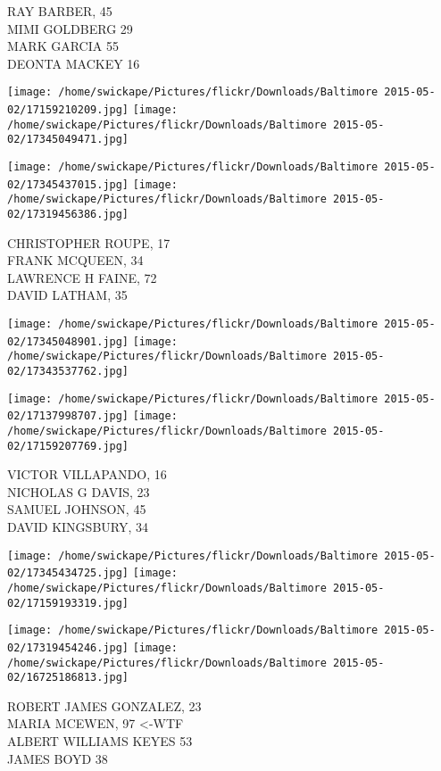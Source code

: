\documentclass[10pt,letterpaper]{article}
\begin{document}
RAY BARBER, 45\\
MIMI GOLDBERG 29\\
MARK GARCIA 55\\
DEONTA MACKEY 16
\pagebreak

\texttt{[image: /home/swickape/Pictures/flickr/Downloads/Baltimore 2015-05-02/17159210209.jpg]}
\texttt{[image: /home/swickape/Pictures/flickr/Downloads/Baltimore 2015-05-02/17345049471.jpg]}

\texttt{[image: /home/swickape/Pictures/flickr/Downloads/Baltimore 2015-05-02/17345437015.jpg]}
\texttt{[image: /home/swickape/Pictures/flickr/Downloads/Baltimore 2015-05-02/17319456386.jpg]}

CHRISTOPHER ROUPE, 17\\
FRANK MCQUEEN, 34\\
LAWRENCE H FAINE, 72\\
DAVID LATHAM, 35
\pagebreak

\texttt{[image: /home/swickape/Pictures/flickr/Downloads/Baltimore 2015-05-02/17345048901.jpg]}
\texttt{[image: /home/swickape/Pictures/flickr/Downloads/Baltimore 2015-05-02/17343537762.jpg]}

\texttt{[image: /home/swickape/Pictures/flickr/Downloads/Baltimore 2015-05-02/17137998707.jpg]}
\texttt{[image: /home/swickape/Pictures/flickr/Downloads/Baltimore 2015-05-02/17159207769.jpg]}

VICTOR VILLAPANDO, 16\\
NICHOLAS G DAVIS, 23\\
SAMUEL JOHNSON, 45\\
DAVID KINGSBURY, 34
\pagebreak

\texttt{[image: /home/swickape/Pictures/flickr/Downloads/Baltimore 2015-05-02/17345434725.jpg]}
\texttt{[image: /home/swickape/Pictures/flickr/Downloads/Baltimore 2015-05-02/17159193319.jpg]}

\texttt{[image: /home/swickape/Pictures/flickr/Downloads/Baltimore 2015-05-02/17319454246.jpg]}
\texttt{[image: /home/swickape/Pictures/flickr/Downloads/Baltimore 2015-05-02/16725186813.jpg]}

ROBERT JAMES GONZALEZ, 23\\
MARIA MCEWEN, 97 <{-}WTF\\
ALBERT WILLIAMS KEYES 53\\
JAMES BOYD 38
\pagebreak
\end{document}
